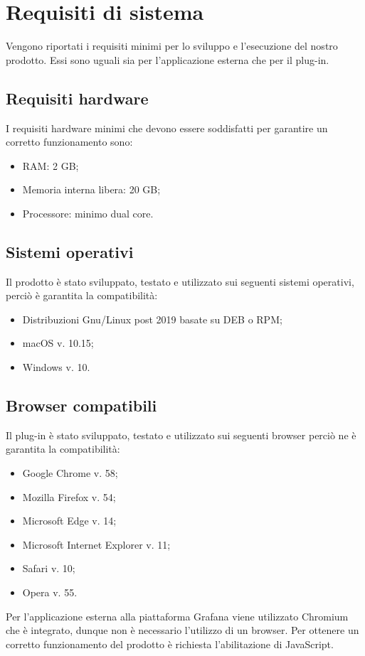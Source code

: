 \section{Requisiti di sistema}
Vengono riportati i requisiti minimi per lo sviluppo e l'esecuzione del nostro prodotto. Essi sono uguali sia per l'applicazione esterna che per il plug-in.

\subsection{Requisiti hardware}
I requisiti hardware minimi che devono essere soddisfatti per garantire un corretto funzionamento sono:
\begin{itemize}
	\item RAM: 2 GB;
	\item Memoria interna libera: 20 GB;
	\item Processore: minimo dual core.
\end{itemize}

\subsection{Sistemi operativi}
Il prodotto è stato sviluppato, testato e utilizzato sui seguenti sistemi operativi, perciò è garantita la compatibilità:
\begin{itemize}
	\item Distribuzioni Gnu/Linux post 2019 basate su DEB o RPM;
	\item macOS v. 10.15;
	\item Windows v. 10.
\end{itemize}

\subsection{Browser compatibili}
Il plug-in è stato sviluppato, testato e utilizzato sui seguenti browser perciò ne è garantita la compatibilità:
\begin{itemize}
	\item Google Chrome v. 58;
	\item Mozilla Firefox v. 54;
	\item Microsoft Edge v. 14;
	\item Microsoft Internet Explorer v. 11;
	\item Safari v. 10;
	\item Opera v. 55.
\end{itemize}
Per l'applicazione esterna alla piattaforma Grafana viene utilizzato Chromium che è integrato, dunque non è necessario l'utilizzo di un browser.
Per ottenere un corretto funzionamento del prodotto è richiesta l'abilitazione di JavaScript.
